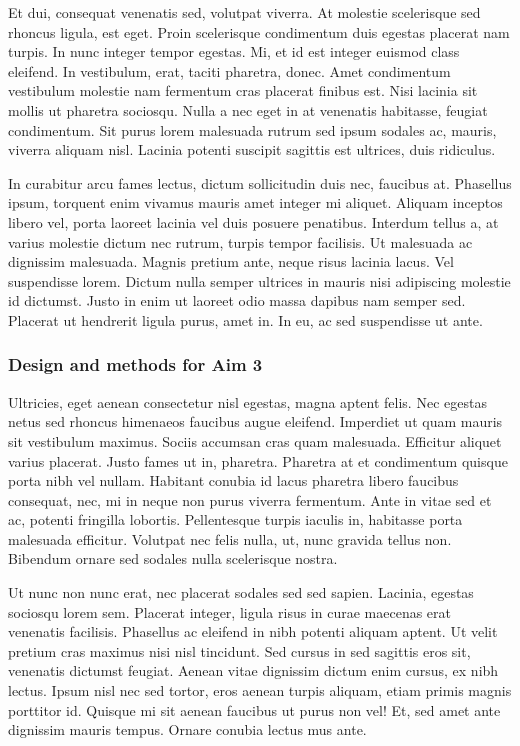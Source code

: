 \documentclass[11pt,]{article}
\begin{document}
Et dui, consequat venenatis sed, volutpat viverra. At molestie
scelerisque sed rhoncus ligula, est eget. Proin scelerisque condimentum
duis egestas placerat nam turpis. In nunc integer tempor egestas. Mi, et
id est integer euismod class eleifend. In vestibulum, erat, taciti
pharetra, donec. Amet condimentum vestibulum molestie nam fermentum cras
placerat finibus est. Nisi lacinia sit mollis ut pharetra sociosqu.
Nulla a nec eget in at venenatis habitasse, feugiat condimentum. Sit
purus lorem malesuada rutrum sed ipsum sodales ac, mauris, viverra
aliquam nisl. Lacinia potenti suscipit sagittis est ultrices, duis
ridiculus.

In curabitur arcu fames lectus, dictum sollicitudin duis nec, faucibus
at. Phasellus ipsum, torquent enim vivamus mauris amet integer mi
aliquet. Aliquam inceptos libero vel, porta laoreet lacinia vel duis
posuere penatibus. Interdum tellus a, at varius molestie dictum nec
rutrum, turpis tempor facilisis. Ut malesuada ac dignissim malesuada.
Magnis pretium ante, neque risus lacinia lacus. Vel suspendisse lorem.
Dictum nulla semper ultrices in mauris nisi adipiscing molestie id
dictumst. Justo in enim ut laoreet odio massa dapibus nam semper sed.
Placerat ut hendrerit ligula purus, amet in. In eu, ac sed suspendisse
ut ante.

\hypertarget{design-and-methods-for-aim-3}{%
\subsubsection{Design and methods for Aim
3}\label{design-and-methods-for-aim-3}}

Ultricies, eget aenean consectetur nisl egestas, magna aptent felis. Nec
egestas netus sed rhoncus himenaeos faucibus augue eleifend. Imperdiet
ut quam mauris sit vestibulum maximus. Sociis accumsan cras quam
malesuada. Efficitur aliquet varius placerat. Justo fames ut in,
pharetra. Pharetra at et condimentum quisque porta nibh vel nullam.
Habitant conubia id lacus pharetra libero faucibus consequat, nec, mi in
neque non purus viverra fermentum. Ante in vitae sed et ac, potenti
fringilla lobortis. Pellentesque turpis iaculis in, habitasse porta
malesuada efficitur. Volutpat nec felis nulla, ut, nunc gravida tellus
non. Bibendum ornare sed sodales nulla scelerisque nostra.

Ut nunc non nunc erat, nec placerat sodales sed sed sapien. Lacinia,
egestas sociosqu lorem sem. Placerat integer, ligula risus in curae
maecenas erat venenatis facilisis. Phasellus ac eleifend in nibh potenti
aliquam aptent. Ut velit pretium cras maximus nisi nisl tincidunt. Sed
cursus in sed sagittis eros sit, venenatis dictumst feugiat. Aenean
vitae dignissim dictum enim cursus, ex nibh lectus. Ipsum nisl nec sed
tortor, eros aenean turpis aliquam, etiam primis magnis porttitor id.
Quisque mi sit aenean faucibus ut purus non vel! Et, sed amet ante
dignissim mauris tempus. Ornare conubia lectus mus ante.
\end{document}
